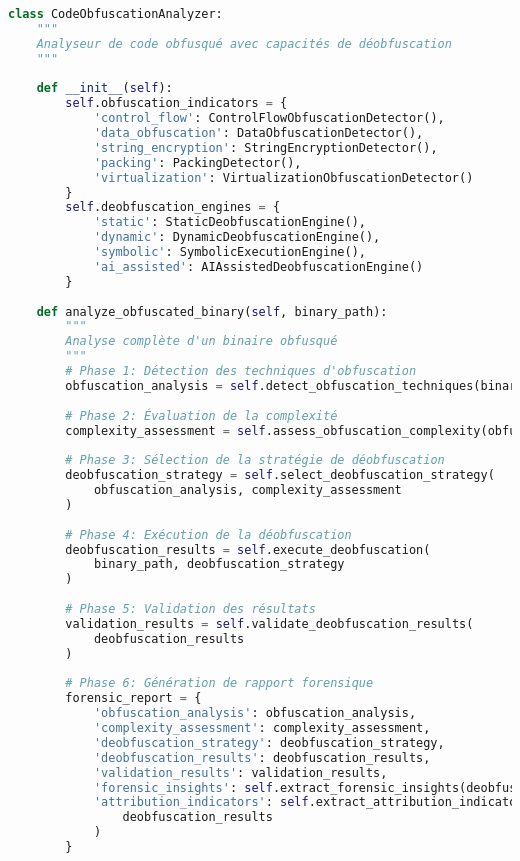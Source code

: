 \begin{lstlisting}[language=Python, caption=Système de détection et déobfuscation avancé]
class CodeObfuscationAnalyzer:
    """
    Analyseur de code obfusqué avec capacités de déobfuscation
    """
    
    def __init__(self):
        self.obfuscation_indicators = {
            'control_flow': ControlFlowObfuscationDetector(),
            'data_obfuscation': DataObfuscationDetector(),
            'string_encryption': StringEncryptionDetector(),
            'packing': PackingDetector(),
            'virtualization': VirtualizationObfuscationDetector()
        }
        self.deobfuscation_engines = {
            'static': StaticDeobfuscationEngine(),
            'dynamic': DynamicDeobfuscationEngine(),
            'symbolic': SymbolicExecutionEngine(),
            'ai_assisted': AIAssistedDeobfuscationEngine()
        }
        
    def analyze_obfuscated_binary(self, binary_path):
        """
        Analyse complète d'un binaire obfusqué
        """
        # Phase 1: Détection des techniques d'obfuscation
        obfuscation_analysis = self.detect_obfuscation_techniques(binary_path)
        
        # Phase 2: Évaluation de la complexité
        complexity_assessment = self.assess_obfuscation_complexity(obfuscation_analysis)
        
        # Phase 3: Sélection de la stratégie de déobfuscation
        deobfuscation_strategy = self.select_deobfuscation_strategy(
            obfuscation_analysis, complexity_assessment
        )
        
        # Phase 4: Exécution de la déobfuscation
        deobfuscation_results = self.execute_deobfuscation(
            binary_path, deobfuscation_strategy
        )
        
        # Phase 5: Validation des résultats
        validation_results = self.validate_deobfuscation_results(
            deobfuscation_results
        )
        
        # Phase 6: Génération de rapport forensique
        forensic_report = {
            'obfuscation_analysis': obfuscation_analysis,
            'complexity_assessment': complexity_assessment,
            'deobfuscation_strategy': deobfuscation_strategy,
            'deobfuscation_results': deobfuscation_results,
            'validation_results': validation_results,
            'forensic_insights': self.extract_forensic_insights(deobfuscation_results),
            'attribution_indicators': self.extract_attribution_indicators(
                deobfuscation_results
            )
        }
        

\end{lstlisting}
